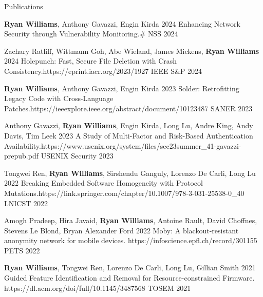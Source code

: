 \documentclass[]{cv}
\begin{document}
\begin{section}{Publications}

\begin{pub}
    {\textbf{Ryan Williams}, Anthony Gavazzi, Engin Kirda}
    {2024}
    {Enhancing Network Security through Vulnerability Monitoring.}{#}
    {NSS 2024}
\end{pub}

\begin{pub}
    {Zachary Ratliff, Wittmann Goh, Abe Wieland, James Mickens, \textbf{Ryan Williams}}
    {2024}
    {Holepunch: Fast, Secure File Deletion with Crash Consistency.}{https://eprint.iacr.org/2023/1927}
    {IEEE S&P 2024}
\end{pub}

\begin{pub}
    {\textbf{Ryan Williams}, Anthony Gavazzi, Engin Kirda}
    {2023}
    {Solder: Retrofitting Legacy Code with Cross-Language Patches.}{https://ieeexplore.ieee.org/abstract/document/10123487}
    {SANER 2023}
\end{pub}

\begin{pub}
    {Anthony Gavazzi, \textbf{Ryan Williams}, Engin Kirda, Long Lu, Andre King, Andy Davis, Tim Leek}
    {2023}
    {A Study of Multi-Factor and Risk-Based Authentication Availability.}{https://www.usenix.org/system/files/sec23summer_41-gavazzi-prepub.pdf}
    {USENIX Security 2023}
\end{pub}

\begin{pub}
    {Tongwei Ren, \textbf{Ryan Williams}, Sirshendu Ganguly, Lorenzo De Carli, Long Lu}
    {2022}
    {Breaking Embedded Software Homogeneity with Protocol Mutations.}{https://link.springer.com/chapter/10.1007/978-3-031-25538-0_40}
    {LNICST 2022}
\end{pub}

\begin{pub}
    {Amogh Pradeep, Hira Javaid, \textbf{Ryan Williams}, Antoine Rault, David Choffnes, Stevens Le Blond, Bryan Alexander Ford}
    {2022}
    {Moby: A blackout-resistant anonymity network for mobile devices.}
    {https://infoscience.epfl.ch/record/301155}
    {PETS 2022}
\end{pub}

\begin{pub}
    {\textbf{Ryan Williams}, Tongwei Ren, Lorenzo De Carli, Long Lu, Gillian Smith}
    {2021}
    {Guided Feature Identification and Removal for Resource-constrained Firmware.}
    {https://dl.acm.org/doi/full/10.1145/3487568}
    {TOSEM 2021}
\end{pub}


\end{section}
\end{document}
